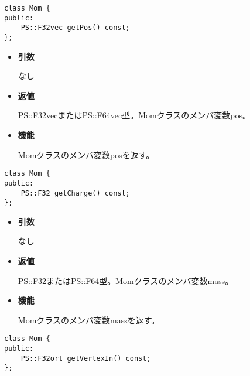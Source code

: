 
\begin{screen}
\begin{verbatim}
class Mom {
public:
    PS::F32vec getPos() const;
};
\end{verbatim}
\end{screen}

\begin{itemize}

\item {\bf 引数}

  なし
  
\item {\bf 返値}

  PS::F32vecまたはPS::F64vec型。Momクラスのメンバ変数pos。

\item {\bf 機能}

  Momクラスのメンバ変数posを返す。
  
\end{itemize}


\begin{screen}
\begin{verbatim}
class Mom {
public:
    PS::F32 getCharge() const;
};
\end{verbatim}
\end{screen}

\begin{itemize}

\item {\bf 引数}

  なし
  
\item {\bf 返値}

  PS::F32またはPS::F64型。Momクラスのメンバ変数mass。

\item {\bf 機能}

  Momクラスのメンバ変数massを返す。
  
\end{itemize}


\begin{screen}
\begin{verbatim}
class Mom {
public:
    PS::F32ort getVertexIn() const;
};
\end{verbatim}
\end{screen}

